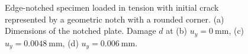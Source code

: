 \begin{figure}[htb!]
\begin{subfigure}[b]{0.06\textwidth}
    \vspace{0.15in}
  \end{subfigure}
  \caption{Edge-notched specimen loaded in tension with initial crack represented by a geometric notch with a rounded corner.  (a) Dimensions of the notched plate. Damage $d$ at (b) $u_y = \SI{0}{\milli\meter}$, (c) $u_y = \SI{0.0048}{\milli\meter}$, (d) $u_y = \SI{0.006}{\milli\meter}$.}
  \label{fig: Chapter4/mode1_notched_plate}
\end{figure}
